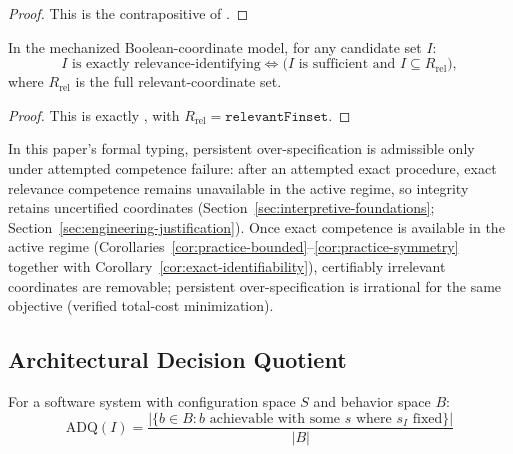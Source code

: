 \begin{proof}
This is the contrapositive of .
\end{proof}

\begin{corollary}\label{cor:exact-identifiability}
In the mechanized Boolean-coordinate model, for any candidate set $I$:
\[
I \text{ is exactly relevance-identifying}
\iff
\bigl(I \text{ is sufficient and } I \subseteq R_{\mathrm{rel}}\bigr),
\]
where $R_{\mathrm{rel}}$ is the full relevant-coordinate set.
\end{corollary}

\begin{proof}
This is exactly
,
with $R_{\mathrm{rel}}=\texttt{relevantFinset}$.
\end{proof}

\begin{remark}\label{rem:overmodel-conditional}
In this paper's formal typing, persistent over-specification is admissible only under attempted competence failure: after an attempted exact procedure, exact relevance competence remains unavailable in the active regime, so integrity retains uncertified coordinates (Section~\ref{sec:interpretive-foundations}; Section~\ref{sec:engineering-justification}).
Once exact competence is available in the active regime (Corollaries~\ref{cor:practice-bounded}--\ref{cor:practice-symmetry} together with Corollary~\ref{cor:exact-identifiability}), certifiably irrelevant coordinates are removable; persistent over-specification is irrational for the same objective (verified total-cost minimization).
\end{remark}

\subsection{Architectural Decision Quotient}

\begin{definition}
For a software system with configuration space $S$ and behavior space $B$:
\[
\text{ADQ}(I) = \frac{|\{b \in B : b \text{ achievable with some } s \text{ where } s_I \text{ fixed}\}|}{|B|}
\]
\end{definition}

